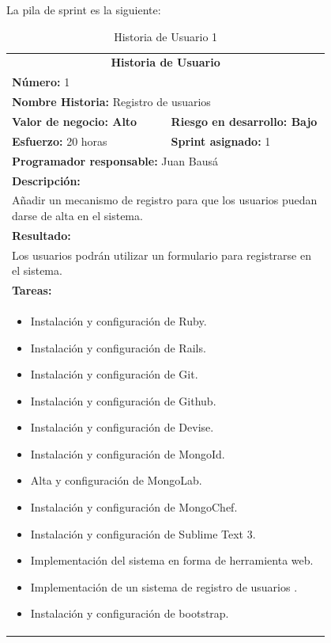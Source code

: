 	La pila de sprint es la siguiente:
	
	\begin{table}[H]
	  \centering 
	  \begin{tabular}{p{0.4\linewidth}p{0.4\linewidth}}
	    \toprule
	    \multicolumn{2}{c}{\cellcolor{black!30}\textbf{Historia de Usuario}} 													\\
		\multicolumn{2}{l}{\cellcolor{gray!25}\textbf{Número: }1}																\\
		\multicolumn{2}{l}{\textbf{Nombre Historia: } Registro de usuarios}													\\
		\cellcolor{gray!25}\textbf{Valor de negocio: Alto}	&	\cellcolor{gray!25}\textbf{Riesgo en desarrollo: Bajo}			\\
		\textbf{Esfuerzo:} 20 horas				&	\textbf{Sprint asignado: }1 												\\
		\multicolumn{2}{l}{\cellcolor{gray!25}\textbf{Programador responsable: }Juan Bausá}									\\
		\multicolumn{2}{l}{\textbf{Descripción:}}                                                     						\\
		\multicolumn{2}{l}{	Añadir un mecanismo de registro para que los usuarios puedan darse de alta en el sistema.} 		\\
		\multicolumn{2}{l}{\cellcolor{gray!25}\textbf{Resultado:}}																\\
		\multicolumn{2}{l}{Los usuarios podrán utilizar un formulario para registrarse en el sistema.} 						\\
		\multicolumn{2}{l}{\textbf{Tareas:}}																					\\
		\multicolumn{2}{l}{
			\begin{minipage}{5in}
	    		\vskip 4pt
	    		\begin{itemize}
					\item Instalación y configuración de Ruby.
					\item Instalación y configuración de Rails.
					\item Instalación y configuración de Git.
					\item Instalación y configuración de Github.
					\item Instalación y configuración de Devise.
					\item Instalación y configuración de MongoId.
					\item Alta y configuración de MongoLab.
					\item Instalación y configuración de MongoChef.
					\item Instalación y configuración de Sublime Text 3.
					\item Implementación del sistema en forma de herramienta web.
					\item Implementación de un sistema de registro de usuarios	.
					\item Instalación y configuración de bootstrap.
				\end{itemize}
			  	\vskip 4pt
		 	\end{minipage}
		} \\																				
	    \hline
	  \end{tabular}
	  \caption{Historia de Usuario 1}
	\end{table}
	
